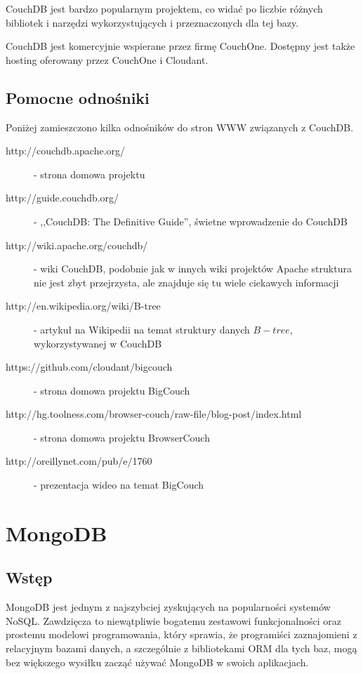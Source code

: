 CouchDB jest bardzo popularnym projektem, co widać po liczbie różnych bibliotek i narzędzi wykorzystujących i przeznaczonych dla tej bazy.

CouchDB jest komercyjnie wspierane przez firmę CouchOne.
Dostępny jest także hosting oferowany przez CouchOne i Cloudant.

\subsection*{Pomocne odnośniki}

Poniżej zamieszczono kilka odnośników do stron WWW związanych z CouchDB.

\begin{description}
 \item [http://couchdb.apache.org/] - strona domowa projektu
 \item [http://guide.couchdb.org/] - ,,CouchDB: The Definitive Guide'', świetne wprowadzenie do CouchDB
 \item [http://wiki.apache.org/couchdb/] - wiki CouchDB, podobnie jak w innych wiki projektów Apache struktura nie jest zbyt przejrzysta, ale znajduje się tu wiele ciekawych informacji
 \item [http://en.wikipedia.org/wiki/B-tree] - artykuł na Wikipedii na temat struktury danych $B-tree$, wykorzystywanej w CouchDB 
 \item [https://github.com/cloudant/bigcouch] - strona domowa projektu BigCouch
 \item [http://hg.toolness.com/browser-couch/raw-file/blog-post/index.html] - strona domowa projektu BrowserCouch
 \item [http://oreillynet.com/pub/e/1760] - prezentacja wideo na temat BigCouch
\end{description}

\section{MongoDB}
\label{sec:mongodb}

\subsection*{Wstęp} 

MongoDB jest jednym z najszybciej zyskujących na popularności systemów NoSQL.
Zawdzięcza to niewątpliwie bogatemu zestawowi funkcjonalności oraz prostemu modelowi programowania, który sprawia, że programiści zaznajomieni z relacyjnym bazami danych, a szczególnie z bibliotekami ORM dla tych baz, mogą bez większego wysiłku zacząć używać MongoDB w swoich aplikacjach.

